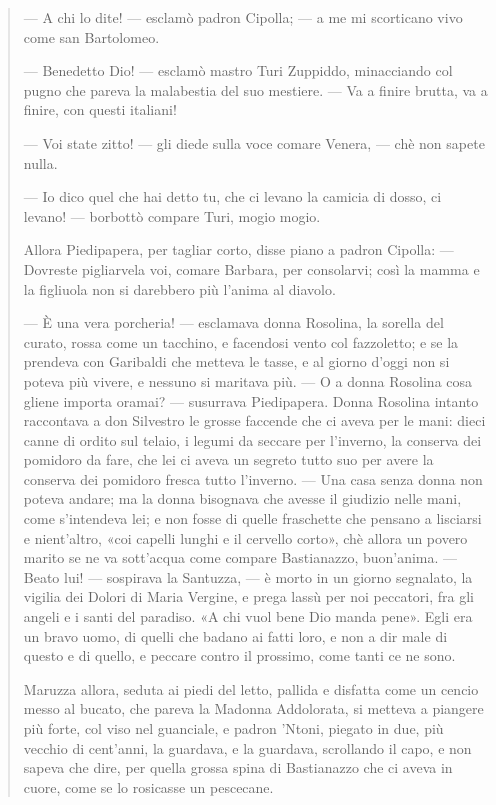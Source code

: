 \documentclass{book}
\newcounter{mar}
\begin{document}
\begin{quote}
— A chi lo dite! — esclamò padron Cipolla; — a me mi scorticano vivo come san Bartolomeo.

— Benedetto Dio! — esclamò mastro Turi Zuppiddo, minacciando col pugno che pareva la malabestia del suo mestiere. — Va a finire brutta, va a finire, con questi italiani!

— Voi state zitto! — gli diede sulla voce comare Venera, — chè non sapete nulla.

— Io dico quel che hai detto tu, che ci levano la camicia di dosso, ci levano! — borbottò compare Turi, mogio mogio.

Allora Piedipapera, per tagliar corto, disse piano a padron Cipolla: — Dovreste pigliarvela voi, comare Barbara, per consolarvi; così la mamma e la figliuola non si darebbero più l’anima al diavolo.

— È una vera porcheria! — esclamava donna Rosolina, la sorella del curato, rossa come un tacchino, e facendosi vento col fazzoletto; e se la prendeva con Garibaldi che metteva le tasse, e al giorno d’oggi non si poteva più vivere, e nessuno si maritava più. — O a donna Rosolina cosa gliene importa oramai? — susurrava Piedipapera. Donna Rosolina intanto raccontava a don Silvestro le grosse faccende che ci aveva per le mani: dieci canne di ordito sul telaio, i legumi da seccare per l’inverno, la conserva dei pomidoro da fare, che lei ci aveva un segreto tutto suo per avere la conserva dei pomidoro fresca tutto l’inverno. — Una casa senza donna non poteva andare; ma la donna bisognava che avesse il giudizio nelle mani, come s’intendeva lei; e non fosse di quelle fraschette che pensano a lisciarsi e nient’altro, «coi capelli lunghi e il cervello corto», chè allora un povero marito se ne va sott’acqua come compare Bastianazzo, buon’anima. — Beato lui! — sospirava la Santuzza, — è morto in un giorno segnalato, la vigilia dei Dolori di Maria Vergine, e prega lassù per noi peccatori, fra gli angeli e i santi del paradiso. «A chi vuol bene Dio manda pene». Egli era un bravo uomo, di quelli che badano ai fatti loro, e non a dir male di questo e di quello, e peccare contro il prossimo, come tanti ce ne sono.

Maruzza allora, seduta ai piedi del letto, pallida e disfatta come un cencio messo al bucato, che pareva la Madonna Addolorata, si metteva a piangere più forte, col viso nel guanciale, e padron ’Ntoni, piegato in due, più vecchio di cent’anni, la guardava, e la guardava, scrollando il capo, e non sapeva che dire, per quella grossa spina di Bastianazzo che ci aveva in cuore, come se lo rosicasse un pescecane.


\end{quote}
\end{document}
